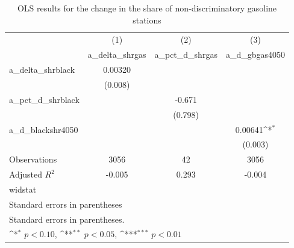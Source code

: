 \begin{table}[htbp]\centering
\def\sym#1{\ifmmode^{#1}\else\(^{#1}\)\fi}
\caption{OLS results for the change in the share of non-discriminatory gasoline stations}
\begin{tabular}{l*{3}{c}}
\hline\hline
                    &\multicolumn{1}{c}{(1)}&\multicolumn{1}{c}{(2)}&\multicolumn{1}{c}{(3)}\\
                    &\multicolumn{1}{c}{a\_delta\_shrgas}&\multicolumn{1}{c}{a\_pct\_d\_shrgas}&\multicolumn{1}{c}{a\_d\_gbgas4050}\\
\hline
a\_delta\_shrblack    &     0.00320         &                     &                     \\
                    &     (0.008)         &                     &                     \\
[1em]
a\_pct\_d\_shrblack    &                     &      -0.671         &                     \\
                    &                     &     (0.798)         &                     \\
[1em]
a\_d\_blackshr4050    &                     &                     &     0.00641\sym{*}  \\
                    &                     &                     &     (0.003)         \\
\hline
Observations        &        3056         &          42         &        3056         \\
Adjusted \(R^{2}\)  &      -0.005         &       0.293         &      -0.004         \\
widstat             &                     &                     &                     \\
\hline\hline
\multicolumn{4}{l}{\footnotesize Standard errors in parentheses}\\
\multicolumn{4}{l}{\footnotesize Standard errors in parentheses.}\\
\multicolumn{4}{l}{\footnotesize \sym{*} \(p<0.10\), \sym{**} \(p<0.05\), \sym{***} \(p<0.01\)}\\
\end{tabular}
\end{table}
